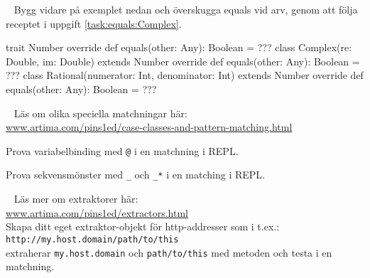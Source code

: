\SOLUTION


\TaskSolved \what



\QUESTEND







\QUESTBEGIN

\Task  \what~ Bygg vidare på exemplet nedan och överskugga equals vid arv, genom att följa receptet i uppgift \ref{task:equals:Complex}.
\begin{Code}
trait Number {
  override def equals(other: Any): Boolean = ???
}
class Complex(re: Double, im: Double) extends Number {
  override def equals(other: Any): Boolean = ???
}
class Rational(numerator: Int, denominator: Int) extends Number {
  override def equals(other: Any): Boolean = ???
}
\end{Code}


\SOLUTION


\TaskSolved \what



\QUESTEND







\QUESTBEGIN

\Task  \what~ Läs om olika speciella matchningar här: \\
\href{http://www.artima.com/pins1ed/case-classes-and-pattern-matching.html}{www.artima.com/pins1ed/case-classes-and-pattern-matching.html}

\Subtask Prova variabelbinding med \texttt{@} i en matchning i REPL.

\Subtask Prova sekvensmönster med \texttt{\_} och \texttt{\_*} i en matching i REPL.

\SOLUTION


\TaskSolved \what



\QUESTEND







\QUESTBEGIN

\Task \label{task:extractor} \what~  Läs mer om extraktorer här: \\ \href{http://www.artima.com/pins1ed/extractors.html}{www.artima.com/pins1ed/extractors.html} \\
Skapa ditt eget extraktor-objekt för http-addresser som i t.ex.: \\
\texttt{http://my.host.domain/path/to/this} \\ extraherar \texttt{my.host.domain} och \texttt{path/to/this} med metoden  och testa i en matchning.

